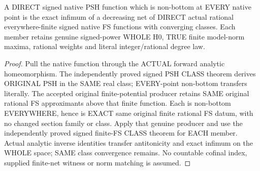 \begin{theorem}
\label{thm:seven-native-signed-finite-net-arbitrary-field}
\leanok
A DIRECT signed native PSH function which is non-bottom at EVERY native
point is the exact infimum of a decreasing net of DIRECT actual rational
everywhere-finite signed native FS functions with converging classes.
Each member retains genuine signed-power WHOLE H0, TRUE finite model-norm
maxima, rational weights and literal integer/rational degree law.
\end{theorem}
\begin{proof}
Pull the native function through the ACTUAL forward analytic homeomorphism.
The independently proved signed PSH CLASS theorem derives ORIGINAL PSH
in the SAME real class; EVERY-point non-bottom transfers literally.
The accepted original finite-potential producer retains SAME original
rational FS approximants above that finite function. Each is non-bottom
EVERYWHERE, hence is EXACT same original finite rational FS datum, with
no changed section family or class. Apply that genuine producer and
use the independently proved signed finite-FS CLASS theorem for EACH
member. Actual analytic inverse identities transfer antitonicity and
exact infimum on the WHOLE space; SAME class convergence remains. No
countable cofinal index, supplied finite-net witness or norm matching
is assumed.
\end{proof}


